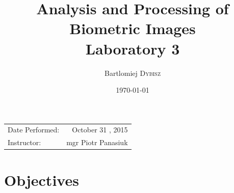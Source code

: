 \documentclass{article}
\title{Analysis and Processing of Biometric Images \\ Laboratory 3} %
\author{Bartlomiej \textsc{Dybisz}} %
\date{\today} %
\begin{document}
\maketitle %

\begin{center}
\begin{tabular}{l r}
Date Performed: & October 31 , 2015 \\ %
Instructor: & mgr Piotr Panasiuk %
\end{tabular}
\end{center}



\section{Objectives}
\end{document}
